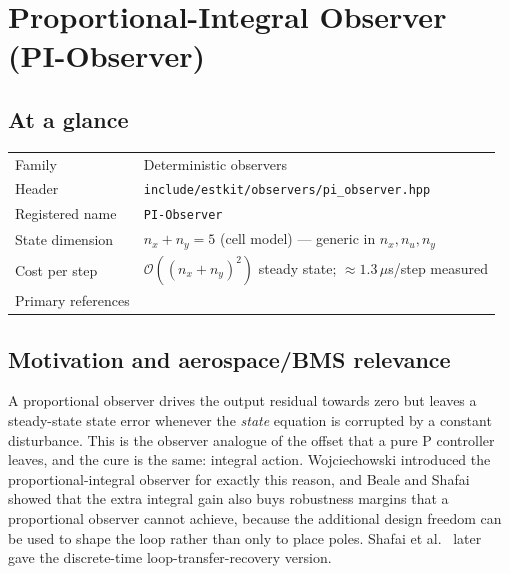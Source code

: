 \chapter{Proportional-Integral Observer (PI-Observer)}
\label{ch:piobserver}

\section*{At a glance}
\begin{tabular}{@{}l>{\raggedright\arraybackslash}p{}@{}}
Family & Deterministic observers \\
Header & \texttt{include/estkit/observers/pi\_observer.hpp} \\
Registered name & \texttt{PI-Observer} \\
State dimension & $n_x + n_y = 5$ (cell model) --- generic in $n_x, n_u, n_y$ \\
Cost per step & $\mathcal{O}((n_x{+}n_y)^2)$ steady state; $\approx 1.3\,\mu$s/step measured \\
Primary references & \cite{wojciechowski1978,beale1989pi,shafai1996ltrpi,johnson1971dac,luenberger1971} \\
\end{tabular}

\section{Motivation and aerospace/BMS relevance}
A proportional observer drives the output residual towards zero but leaves a steady-state state
error whenever the \emph{state} equation is corrupted by a constant disturbance.  This is the
observer analogue of the offset that a pure P controller leaves, and the cure is the same:
integral action.  Wojciechowski \cite{wojciechowski1978} introduced the proportional-integral
observer for exactly this reason, and Beale and Shafai \cite{beale1989pi} showed that the extra
integral gain also buys robustness margins that a proportional observer cannot achieve, because
the additional design freedom can be used to shape the loop rather than only to place poles.
Shafai et al.\ \cite{shafai1996ltrpi} later gave the discrete-time loop-transfer-recovery
version.

